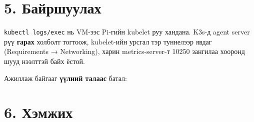 \hypertarget{ux431ux430ux439ux440ux448ux443ux443ux43bux430ux445}{%
\section{5. Байршуулах}\label{ux431ux430ux439ux440ux448ux443ux443ux43bux430ux445}}

\begin{Shaded}
\begin{Highlighting}[]
\end{Highlighting}
\end{Shaded}

\texttt{kubectl\ logs/\allowbreak{}exec} нь VM-ээс Pi-гийн kubelet руу хандана. K3s-д agent server рүү \textbf{гарах} холболт тогтоож, kubelet-ийн урсгал тэр туннелээр явдаг (Requirements → Networking), харин metrics-server-т 10250 зангилаа хооронд шууд нээлттэй байх ёстой.

Ажиллаж байгааг \textbf{үүлний талаас} батал:

\begin{Shaded}
\begin{Highlighting}[]
\end{Highlighting}
\end{Shaded}

\hypertarget{ux445ux44dux43cux436ux438ux445}{%
\section{6. Хэмжих}\label{ux445ux44dux43cux436ux438ux445}}

